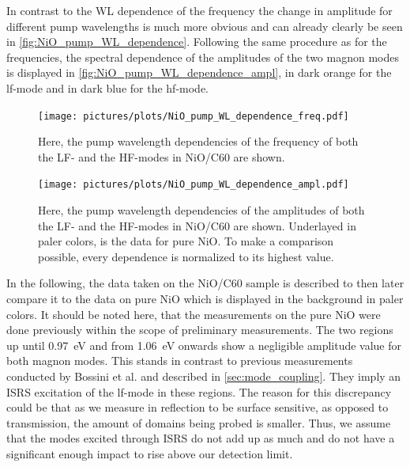 \FloatBarrier
In contrast to the WL dependence of the frequency the change in amplitude for different pump wavelengths is much more obvious and can already clearly be seen in \autoref{fig:NiO_pump_WL_dependence}.
Following the same procedure as for the frequencies, the spectral dependence of the amplitudes of the two magnon modes is displayed in \autoref{fig:NiO_pump_WL_dependence_ampl}, in dark orange for the lf-mode and in dark blue for the hf-mode.
\begin{figure}[ht]
    \centering
    \texttt{[image: pictures/plots/NiO\_pump\_WL\_dependence\_freq.pdf]}
    \caption{Here, the pump wavelength dependencies of the frequency of both the LF- and the HF-modes in NiO/C60 are shown.}
    \label{fig:NiO_pump_WL_dependence_freq}
\end{figure}
\begin{figure}[ht]
    \centering
    \texttt{[image: pictures/plots/NiO\_pump\_WL\_dependence\_ampl.pdf]}
    \caption{Here, the pump wavelength dependencies of the amplitudes of both the LF- and the HF-modes in NiO/C60 are shown. Underlayed in paler colors, is the data for pure NiO. To make a comparison possible, every dependence is normalized to its highest value.}
    \label{fig:NiO_pump_WL_dependence_ampl}
\end{figure}
\FloatBarrier
In the following, the data taken on the NiO/C60 sample is described to then later compare it to the data on pure NiO which is displayed in the background in paler colors.
It should be noted here, that the measurements on the pure NiO were done previously within the scope of preliminary measurements.
The two regions up until \qty{0.97}{eV} and from \qty{1.06}{eV} onwards show a negligible amplitude value for both magnon modes.
This stands in contrast to previous measurements conducted by Bossini et al. and described in \autoref{sec:mode_coupling}.
They imply an ISRS excitation of the lf-mode in these regions.
The reason for this discrepancy could be that as we measure in reflection to be surface sensitive, as opposed to transmission, the amount of domains being probed is smaller.
Thus, we assume that the modes excited through ISRS do not add up as much and do not have a significant enough impact to rise above our detection limit. \\
